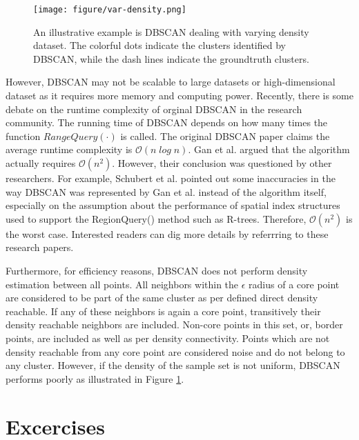 \begin{figure}
	\centering
	\texttt{[image: figure/var-density.png]}
	\caption{An illustrative example is DBSCAN dealing with varying density 
	dataset. The colorful dots indicate the clusters identified by DBSCAN, 
	while the dash lines indicate the groundtruth clusters.}
      \label{fig:varying}
\end{figure}

However, DBSCAN may not be scalable to large datasets or 
high-dimensional dataset as it requires more memory and computing power. 
Recently, there is some debate on the runtime complexity of orginal DBSCAN in the
research community. The running time of DBSCAN depends on how many times the function
$RangeQuery(\cdot)$ is called. The original DBSCAN paper claims the average runtime 
complexity is 
$\mathit{\mathcal{O}(n \log n)}$. Gan et al. \cite{gan2015dbscan} argued that the algorithm actually requires $\mathcal{O}(n^{2})$.  However, their conclusion was questioned by other researchers. For example, Schubert et al. \cite{schubert2017dbscan} pointed out some inaccuracies in the way DBSCAN was represented by Gan et al. \cite{gan2015dbscan} instead of the algorithm itself, especially on the assumption about the performance of spatial index structures used to support the RegionQuery() method such as R-trees. Therefore, $\mathcal{O}(n^{2})$ is the worst case. Interested readers can dig more details by referrring to these 
research papers.  


Furthermore, for efficiency reasons, DBSCAN does not perform density estimation between 
all points. All neighbors within the $\epsilon$ radius of a core point are 
considered to be part of the same cluster as per defined direct density reachable.
If any of these neighbors is again a core point, transitively 
their density reachable neighbors are included. Non-core 
points in this set, or,
border points, are included as well as per density connectivity. 
Points which are not density reachable from
any core point are considered noise and do not belong to any cluster. However, 
if the density of the sample set is not uniform, DBSCAN performs poorly as illustrated in Figure \ref{fig:varying}. 

\section{Excercises}

